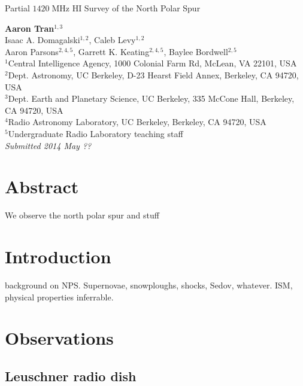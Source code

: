 \documentclass[10pt]{article}
\newcommand {\mt}{\mathrm}
\newcommand {\unit}[1]{\; \mt{#1}}
\begin{document}
\begin{center}
\Large{Partial $1420\unit{MHz}$ HI Survey of the North Polar Spur}

\normalsize
\textbf{Aaron Tran}${}^{1,3}$ \\
Isaac A. Domagalski${}^{1,2}$, Caleb Levy${}^{1,2}$ \\
Aaron Parsons${}^{2,4,5}$, Garrett K. Keating${}^{2,4,5}$, Baylee Bordwell${}^{2,5}$ \\
\footnotesize
${}^1$Central Intelligence Agency, 1000 Colonial Farm Rd, McLean, VA 22101, USA \\
${}^2$Dept. Astronomy, UC Berkeley, D-23 Hearst Field Annex, Berkeley, CA 94720, USA \\
${}^3$Dept. Earth and Planetary Science, UC Berkeley, 335 McCone Hall, Berkeley, CA 94720, USA \\
${}^4$Radio Astronomy Laboratory, UC Berkeley, Berkeley, CA 94720, USA \\
${}^5$Undergraduate Radio Laboratory teaching staff \\
\textit{Submitted 2014 May ??}
\end{center}

\section*{Abstract}

We observe the north polar spur and stuff

\section{Introduction}

background on NPS.  Supernovae, snowploughs, shocks, Sedov, whatever.
ISM, physical properties inferrable.

\section{Observations}

\subsection{Leuschner radio dish}
\end{document}

